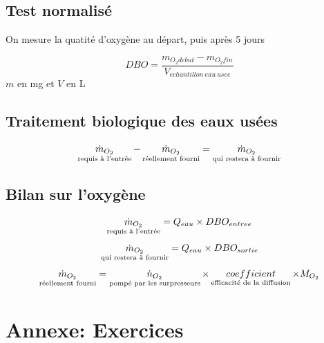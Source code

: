 \documentclass[twocolumn,letterpaper,8pt]{extarticle}
\begin{document}
\subsection{Test normalisé}
On mesure la quatité d'oxygène au départ, puis après 5 jours

$$DBO = \frac{m_{O_2 debut} - m_{O_2 fin}}{V_{echantillon\ eau\ usee}}$$
{\footnotesize *$m$ en mg et $V$ en L}

\subsection{Traitement biologique des eaux usées}
$$\mathop{\dot{m}_{O_2}}_{\textrm{\scriptsize requis à l'entrée}} - \mathop{\dot{m}_{O_2}}_{\textrm{\scriptsize réellement fourni}} = \mathop{\dot{m}_{O_2}}_{\textrm{\scriptsize qui restera à fournir}}$$

\subsection{Bilan sur l'oxygène}
$$\mathop{\dot{m}_{O_2}}_{\textrm{\scriptsize requis à l'entrée}} = Q_{eau} \times DBO_{entree}$$
$$\mathop{\dot{m}_{O_2}}_{\textrm{\scriptsize qui restera à fournir}} = Q_{eau} \times DBO_{sortie}$$
$$\mathop{\dot{m}_{O_2}}_{\textrm{\scriptsize réellement fourni}} = \mathop{\dot{n}_{O_2}}_{\textrm{\scriptsize pompé par les surpresseurs}} \times \mathop{coefficient}_{\textrm{\scriptsize efficacité de la diffusion}} \times M_{O_2}$$

\clearpage
\section{Annexe: Exercices}
\end{document}
